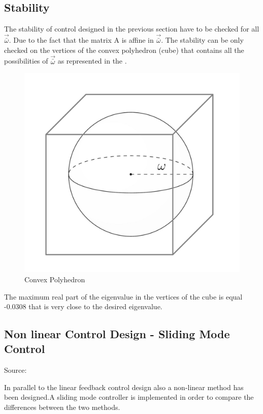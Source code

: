 \subsection{Stability}
The stability of control designed in the previous section have to be checked for all $\vec{\bar{\omega}}$. Due to the fact that the matrix A is affine in $\vec{\bar{\omega}}$. The stability can be only checked on the vertices of the convex polyhedron (cube) that contains all the possibilities of $\vec{\bar{\omega}}$ as represented in the . \cite{NLCS}
\begin{figure}[H]
	\centering
	\includegraphics[width=0.4\linewidth]{figures/cs}
	\caption{Convex Polyhedron}
	\label{fig:sta_PID}
\end{figure} 
The maximum real part of the eigenvalue in the vertices of the cube is equal -0.0308 that is very close to the desired eigenvalue.
%
\subsection{Non linear Control Design - Sliding Mode Control }
Source: \cite{WR}

In parallel to the linear feedback control design also a non-linear method has been designed.A sliding mode controller is implemented in order to compare the differences between the two methods.

